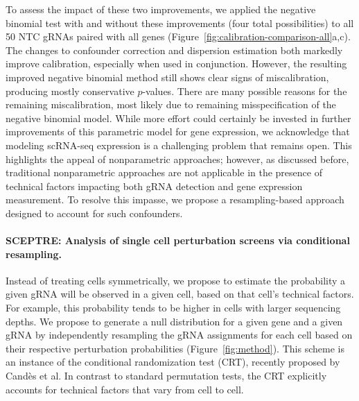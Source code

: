 \documentclass{nature}
\begin{document}
To assess the impact of these two improvements, we applied the negative binomial test with and without these improvements (four total possibilities) to all 50 NTC gRNAs paired with all genes  (Figure~\ref{fig:calibration-comparison-all}a,c). The changes to confounder correction and dispersion estimation both markedly improve calibration, especially when used in conjunction. However, the resulting improved negative binomial method still shows clear signs of miscalibration, producing mostly conservative $p$-values. There are many possible reasons for the remaining miscalibration, most likely due to remaining misspecification of the negative binomial model. While more effort could certainly be invested in further improvements of this parametric model for gene expression, we acknowledge that modeling scRNA-seq expression is a challenging problem that remains open. This highlights the appeal of nonparametric approaches; however, as discussed before, traditional nonparametric approaches are not applicable in the presence of technical factors impacting both gRNA detection and gene expression measurement. To resolve this impasse, we propose a resampling-based approach designed to account for such confounders. 

\clearpage

\paragraph{SCEPTRE: Analysis of single cell perturbation screens via conditional resampling.} 

Instead of treating cells symmetrically, we propose to estimate the probability a given gRNA will be observed in a given cell, based on that cell's technical factors. For example, this probability tends to be higher in cells with larger sequencing depths. We propose to generate a null distribution for a given gene and a given gRNA by independently resampling the gRNA assignments for each cell based on their respective perturbation probabilities (Figure~\ref{fig:method}). This scheme is an instance of the conditional randomization test (CRT), recently proposed by Cand\`{e}s et al.\cite{CetL16} In contrast to standard permutation tests, the CRT explicitly accounts for technical factors that vary from cell to cell.
\end{document}
